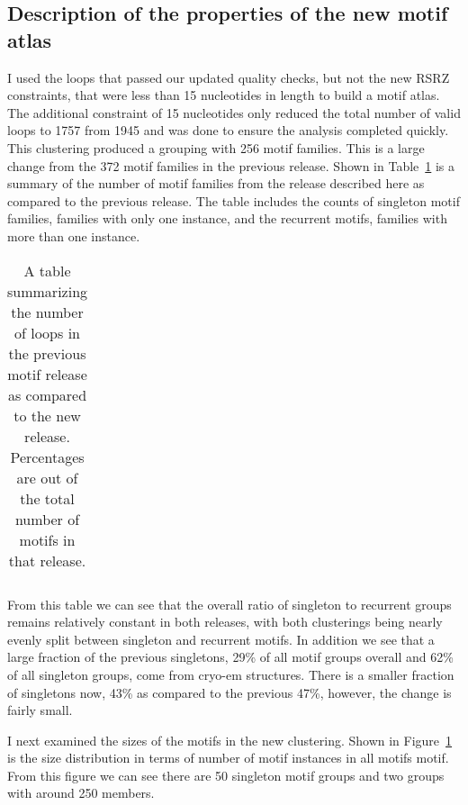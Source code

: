 \subsection{Description of the properties of the new motif atlas}

I used the loops that passed our updated quality checks, but not the new RSRZ
constraints, that were less than 15 nucleotides in length to build a motif
atlas. The additional constraint of 15 nucleotides only reduced the total number
of valid loops to 1757 from 1945 and was done to ensure the analysis completed
quickly. This clustering produced a grouping with 256 motif families. This is a
large change from the 372 motif families in the previous release. Shown in
Table~\ref{tab:loop-counts} is a summary of the number of motif families from
the release described here as compared to the previous release. The table
includes the counts of singleton motif families, families with only one
instance, and the recurrent motifs, families with more than one instance.

\begin{table}
  \begin{tabular}{lr}
    \toprule
    \midrule
    \bottomrule
  \end{tabular}
  \caption{A table summarizing the number of loops in the previous motif
    release as compared to the new release. Percentages are out of the total
    number of motifs in that release.}
  \label{tab:loop-counts}
\end{table}

From this table we can see that the overall ratio of singleton to recurrent
groups remains relatively constant in both releases, with both clusterings being
nearly evenly split between singleton and recurrent motifs. In addition we see
that a large fraction of the previous singletons, 29\% of all motif groups
overall and 62\% of all singleton groups, come from cryo-em structures. There is
a smaller fraction of singletons now, 43\% as compared to the previous 47\%,
however, the change is fairly small.

I next examined the sizes of the motifs in the new clustering. Shown in
Figure~\ref{fig:num-motif-instances} is the size distribution in terms of number
of motif instances in all motifs motif. From this figure we can see there are 50
singleton motif groups and two groups with around 250 members. 

\begin{figure}
  \caption{}
  \label{fig:num-motif-instances}
\end{figure}

